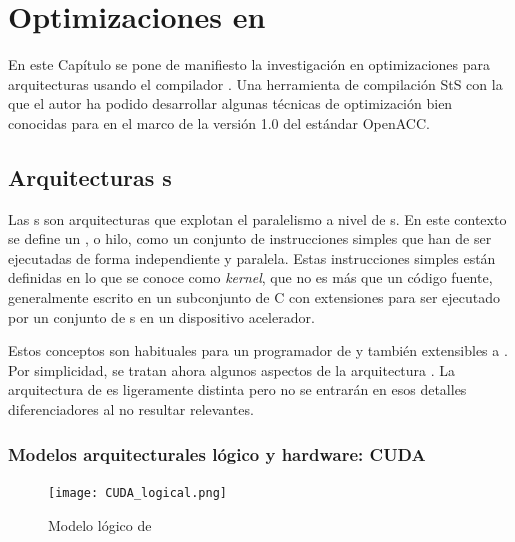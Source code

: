 %
%
%
%

\chapter{Optimizaciones en \gpgpu{}}
\label{chap:optGPGPU}

En este Capítulo se pone de manifiesto la investigación en optimizaciones para
arquitecturas \gpgpu{} usando
el compilador \yacf{}. Una herramienta de compilación \ac{StS} con la 
que el autor ha podido desarrollar algunas técnicas de optimización bien conocidas para 
\gpgpu{} en el marco de la versión 1.0 del estándar \ac{OpenACC}.


\section{Arquitecturas \gpu{}s}
\label{sec:arquitecturasGPU}

Las \gpu{}s son arquitecturas que explotan el paralelismo a nivel de \thread{}s. En este 
contexto se define un \thread{}, o hilo, como un conjunto de instrucciones simples que han 
de ser ejecutadas de forma independiente y paralela. Estas instrucciones simples están 
definidas en lo que se conoce como \textit{kernel}, que no es más que un código fuente, 
generalmente escrito en un subconjunto de C con extensiones para ser ejecutado por un 
conjunto de \thread{}s en un dispositivo acelerador.

Estos conceptos son habituales para un programador de \CUDA{} y también extensibles a 
\OpenCL{}. Por simplicidad, se tratan ahora algunos aspectos de la arquitectura \CUDA{}. 
La arquitectura de \OpenCL{} es ligeramente distinta pero no se entrarán en esos detalles
diferenciadores al no resultar relevantes.

\subsection{Modelos arquitecturales lógico y hardware: CUDA}

\begin{figure}[!h]
	\centering
	\texttt{[image: CUDA\_logical.png]}
	\caption{Modelo lógico de \CUDA{}}
	\label{fig:CUDAlogical}
\end{figure}

